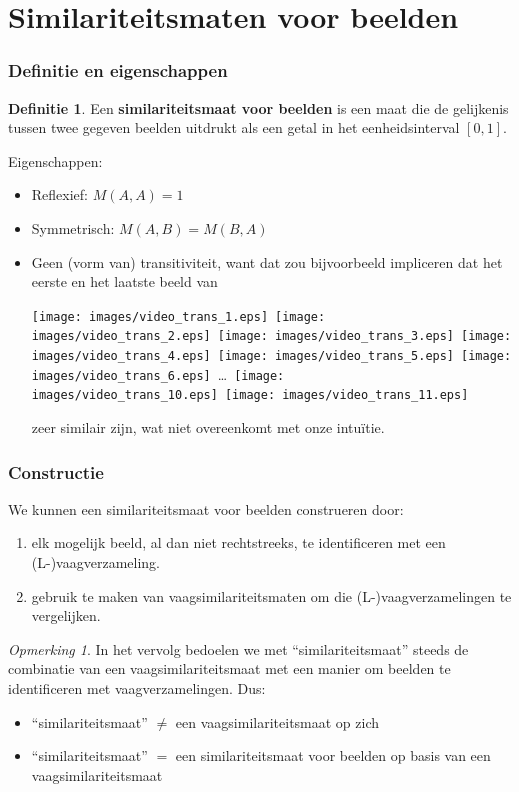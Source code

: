 \documentclass[dutch]{beamer}
\theoremstyle{definition}
\newtheorem{definitie}[theorem]{Definitie}
\theoremstyle{remark}
\newtheorem{opmerking}[theorem]{Opmerking}
\theoremstyle{example}
\begin{document}
\section{Similariteitsmaten voor beelden}
\frame
{
  \frametitle{Definitie en eigenschappen}

  \begin{definitie}
  Een \textbf{similariteitsmaat voor beelden} is een maat die de gelijkenis 
  tussen twee gegeven beelden uitdrukt als een getal in het eenheidsinterval 
  $[0,1]$.
  \end{definitie}

  Eigenschappen:
  \begin{itemize}
  \item Reflexief: $M(A,A)=1$
  \item Symmetrisch: $M(A,B)=M(B,A)$
  \item Geen (vorm van) transitiviteit, want dat zou bijvoorbeeld impliceren dat 
  het eerste en het laatste beeld van
  \begin{center}
  \vspace{5pt}
  \texttt{[image: images/video\_trans\_1.eps]}\ 
  \texttt{[image: images/video\_trans\_2.eps]}\ 
  \texttt{[image: images/video\_trans\_3.eps]}\ 
  \texttt{[image: images/video\_trans\_4.eps]}\ 
  \texttt{[image: images/video\_trans\_5.eps]}\
  \texttt{[image: images/video\_trans\_6.eps]}\ 
  \ldots\ 
  \texttt{[image: images/video\_trans\_10.eps]}\ 
  \texttt{[image: images/video\_trans\_11.eps]}
  \end{center}
  zeer similair zijn, wat niet overeenkomt met onze intu\"itie.
  \end{itemize}
}
\frame
{
  \frametitle{Constructie}
  
  We kunnen een similariteitsmaat voor beelden construeren door:
  \begin{enumerate}
    \item elk mogelijk beeld, al dan niet rechtstreeks, te identificeren
    met een (L-)vaagverzameling.
    \item gebruik te maken van vaagsimilariteitsmaten om die (L-)vaagverzamelingen
    te vergelijken.
  \end{enumerate}
  
  \begin{opmerking}
  In het vervolg bedoelen we met ``similariteitsmaat'' steeds
  de combinatie van een vaagsimilariteitsmaat met een manier om beelden te 
  identificeren met vaagverzamelingen. Dus: 
  \begin{itemize}
    \item ``similariteitsmaat'' $\neq$ een vaagsimilariteitsmaat op zich
    \item ``similariteitsmaat'' $=$ een similariteitsmaat voor beelden op basis van een vaagsimilariteitsmaat
  \end{itemize}
  \end{opmerking}
}
\end{document}
